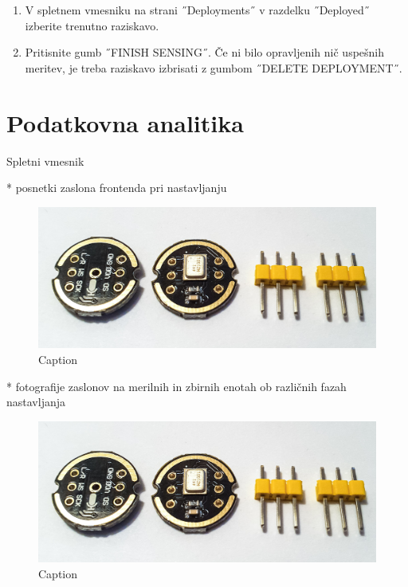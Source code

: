 \documentclass[a4paper, 12pt]{book}
\begin{document}
    \begin{enumerate}
        \item V spletnem vmesniku na strani ˝Deployments˝ v razdelku ˝Deployed˝ izberite trenutno raziskavo. 
        \item Pritisnite gumb ˝FINISH SENSING˝. Če ni bilo opravljenih nič uspešnih meritev, je treba raziskavo izbrisati z gumbom ˝DELETE DEPLOYMENT˝.
    \end{enumerate}
    
    

\section{Podatkovna analitika}









Spletni vmesnik

    
    
 * posnetki zaslona frontenda pri nastavljanju
 \begin{figure}[H]
    \centering
    \includegraphics[width=\linewidth]{slikovno_gradivo/INMP441_1.jpg}
    \caption{Caption}
    \label{fig:INMP441}
\end{figure}
* fotografije zaslonov na merilnih in zbirnih enotah ob različnih fazah nastavljanja
 \begin{figure}[H]
    \centering
    \includegraphics[width=\linewidth]{slikovno_gradivo/INMP441_1.jpg}
    \caption{Caption}
    \label{fig:INMP441}
\end{figure}
 
\end{document}
